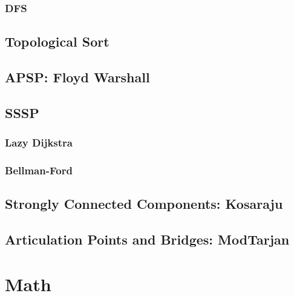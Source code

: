 \subsubsection{DFS}
\subsection{Topological Sort}
\subsection{APSP: Floyd Warshall}
\subsection{SSSP}
\subsubsection{Lazy Dijkstra}
\subsubsection{Bellman-Ford}
\subsection{Strongly Connected Components: Kosaraju}
\subsection{Articulation Points and Bridges: ModTarjan}

\section{Math}
